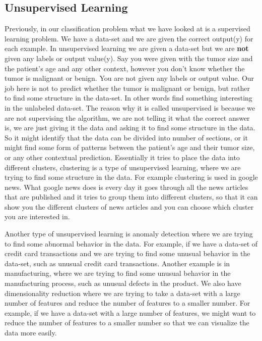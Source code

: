 \subsection{Unsupervised Learning}

Previously, in our classification problem what we have looked at is a supervised learning problem. We have a data-set and we are given the correct output(y) for each example. In unsupervised learning we are given a data-set but we are \textbf{not} given any labels or output value(y). Say you were given with the tumor size and the patient's age and any other context, however you don't know whether the tumor is malignant or benign. You are not given any labels or output value.
Our job here is not to predict whether the tumor is malignant or benign, but rather to find some structure in the data-set. In other words find something interesting in the unlabeled data-set.
The reason why it is called unsupervised is because we are not supervising the algorithm, we are not telling it what the correct answer is, we are just giving it the data and asking it to find some structure in the data.
So it might identify that the data can be divided into number of sections, or it might find some form of patterns between the patient's age and their tumor size, or any other contextual prediction.
Essentially it tries to place the data into different clusters, clustering is a type of unsupervised learning, where we are trying to find some structure in the data. For example clustering is used in google news.
What google news does is every day it goes through all the news articles that are published and it tries to group them into different clusters, so that it can show you the different clusters of news articles and you can choose which cluster you are interested in.

Another type of unsupervised learning is anomaly detection where we are trying to find some abnormal behavior in the data. For example, if we have a data-set of credit card transactions and we are trying to find some unusual behavior in the data-set, such as unusual credit card transactions.
Another example is in manufacturing, where we are trying to find some unusual behavior in the manufacturing process, such as unusual defects in the product.
We also have dimensionality reduction where we are trying to take a data-set with a large number of features and reduce the number of features to a smaller number. For example, if we have a data-set with a large number of features, we might want to reduce the number of features to a smaller number so that we can visualize the data more easily.

